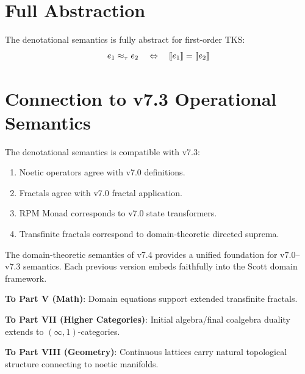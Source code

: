 \section{Full Abstraction}

\begin{theorem}
\label{thm:full-abstraction-first-order}
The denotational semantics is fully abstract for first-order TKS:
\[
e_1 \approx_\tau e_2 \quad \Leftrightarrow \quad \llbracket e_1 \rrbracket = \llbracket e_2 \rrbracket
\]
\end{theorem}

\section{Connection to v7.3 Operational Semantics}

\begin{proposition}
\label{prop:coherence-v73}
The denotational semantics is compatible with v7.3:
\begin{enumerate}[label=(\roman*)]
  \item Noetic operators agree with v7.0 definitions.
  \item Fractals agree with v7.0 fractal application.
  \item RPM Monad corresponds to v7.0 state transformers.
  \item Transfinite fractals correspond to domain-theoretic directed suprema.
\end{enumerate}
\end{proposition}

\begin{theorem}
\label{thm:semantic-unification}
The domain-theoretic semantics of v7.4 provides a unified foundation for
v7.0--v7.3 semantics. Each previous version embeds faithfully into the
Scott domain framework.
\end{theorem}

\begin{tcolorbox}[colback=green!5!white,colframe=green!75!black,title=\textbf{Cross-Track Connections}]
\textbf{To Part V (Math)}: Domain equations support extended transfinite fractals.

\textbf{To Part VII (Higher Categories)}: Initial algebra/final coalgebra duality
extends to $(\infty,1)$-categories.

\textbf{To Part VIII (Geometry)}: Continuous lattices carry natural topological
structure connecting to noetic manifolds.
\end{tcolorbox}

